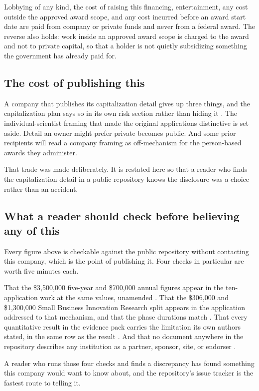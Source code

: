 Lobbying of any kind, the cost of raising this financing, entertainment, any cost
outside the approved award scope, and any cost incurred before an award start
date are paid from company or private funds and never from a federal award. The
reverse also holds: work inside an approved award scope is charged to the award
and not to private capital, so that a holder is not quietly subsidizing something
the government has already paid for.

\subsection{The cost of publishing this}

A company that publishes its capitalization detail gives up three things, and the
capitalization plan says so in its own risk section rather than hiding it
\cite{capitalplan2026}. The individual-scientist framing that made the original
applications distinctive is set aside. Detail an owner might prefer private
becomes public. And some prior recipients will read a company framing as
off-mechanism for the person-based awards they administer.

That trade was made deliberately. It is restated here so that a reader who finds
the capitalization detail in a public repository knows the disclosure was a
choice rather than an accident.

\subsection{What a reader should check before believing any of this}

Every figure above is checkable against the public repository without contacting
this company, which is the point of publishing it. Four checks in particular are
worth five minutes each.

That the \$3,500,000 five-year and \$700,000 annual figures appear in the
ten-application work at the same values, unamended \cite{tenapps2026}. That the
\$306,000 and \$1,300,000 Small Business Innovation Research split appears in the
application addressed to that mechanism, and that the phase durations match
\cite{nihsbirseed}. That every quantitative result in the evidence pack carries
the limitation its own authors stated, in the same row as the result
\cite{capitalplan2026}. And that no document anywhere in the repository describes
any institution as a partner, sponsor, site, or endorser \cite{ucsdmoores2026}.

A reader who runs those four checks and finds a discrepancy has found something
this company would want to know about, and the repository's issue tracker is the
fastest route to telling it.

